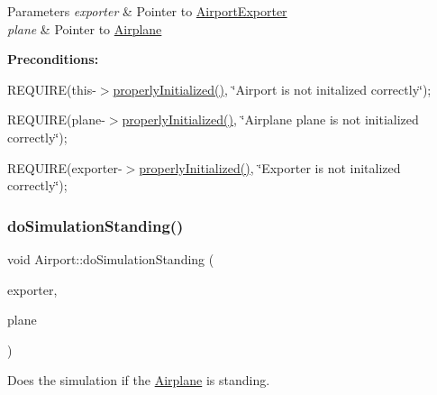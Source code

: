 \begin{DoxyParams}{Parameters}
{\em exporter} & Pointer to \mbox{\hyperlink{class_airport_exporter}{Airport\+Exporter}} \\
\hline
{\em plane} & Pointer to \mbox{\hyperlink{class_airplane}{Airplane}}\\
\hline
\end{DoxyParams}
{\bfseries Preconditions\+:}
\begin{DoxyItemize}
\item R\+E\+Q\+U\+I\+RE(this-\/$>$\mbox{\hyperlink{class_airport_aa13e68ac58e8875837fbe888325cfff6}{properly\+Initialized()}}, \char`\"{}\+Airport is not initalized correctly\char`\"{});
\item R\+E\+Q\+U\+I\+RE(plane-\/$>$\mbox{\hyperlink{class_airport_aa13e68ac58e8875837fbe888325cfff6}{properly\+Initialized()}}, \char`\"{}\+Airplane \textquotesingle{}plane\textquotesingle{} is not initialized correctly\char`\"{});
\item R\+E\+Q\+U\+I\+RE(exporter-\/$>$\mbox{\hyperlink{class_airport_aa13e68ac58e8875837fbe888325cfff6}{properly\+Initialized()}}, \char`\"{}\+Exporter is not initalized correctly\char`\"{}); 
\end{DoxyItemize}\mbox{\label{class_airport_aa27fbfad60f1e3ae54aa656d34b86ba2}} 
\subsubsection{\texorpdfstring{do\+Simulation\+Standing()}{doSimulationStanding()}}
{\footnotesize\ttfamily void Airport\+::do\+Simulation\+Standing (\begin{DoxyParamCaption}\item[{\mbox{\hyperlink{class_airport_exporter}{Airport\+Exporter}} $\ast$}]{exporter,  }\item[{\mbox{\hyperlink{class_airplane}{Airplane}} $\ast$}]{plane }\end{DoxyParamCaption})}



Does the simulation if the \mbox{\hyperlink{class_airplane}{Airplane}} is standing. 


